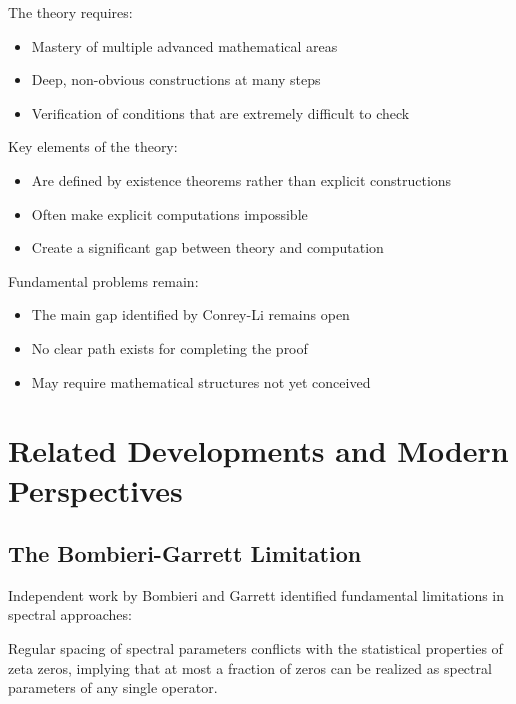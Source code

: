 \begin{limitation}
The theory requires:
\begin{itemize}
\item Mastery of multiple advanced mathematical areas
\item Deep, non-obvious constructions at many steps
\item Verification of conditions that are extremely difficult to check
\end{itemize}
\end{limitation}

\begin{limitation}
Key elements of the theory:
\begin{itemize}
\item Are defined by existence theorems rather than explicit constructions
\item Often make explicit computations impossible
\item Create a significant gap between theory and computation
\end{itemize}
\end{limitation}

\begin{limitation}
Fundamental problems remain:
\begin{itemize}
\item The main gap identified by Conrey-Li remains open
\item No clear path exists for completing the proof
\item May require mathematical structures not yet conceived
\end{itemize}
\end{limitation}

\section{Related Developments and Modern Perspectives}
\label{sec:modern-perspectives}

\subsection{The Bombieri-Garrett Limitation}

Independent work by Bombieri and Garrett identified fundamental limitations in spectral approaches:

\begin{theorem}
Regular spacing of spectral parameters conflicts with the statistical properties of zeta zeros, implying that at most a fraction of zeros can be realized as spectral parameters of any single operator.
\end{theorem}

